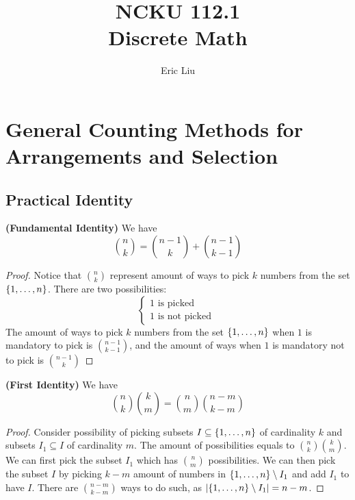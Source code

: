 \documentclass{report}
\title{\Huge{NCKU 112.1}\\Discrete Math}
\author{\huge{Eric Liu}}
\date{}
\begin{document}
\maketitle
\newpage%


\setcounter{chapter}{-1}
\tableofcontents
\pagebreak
\chapter{General Counting Methods for Arrangements and Selection}
\section{Practical Identity}
\begin{theorem}
\label{0.1.1}
\textbf{(Fundamental Identity)} We have
\begin{equation}
\binom{n}{k}=\binom{n-1}{k}+\binom{n-1}{k-1}
\end{equation}
\end{theorem}
\begin{proof}
Notice that  $\binom{n}{k}$ represent amount of ways to pick $k$ numbers from the set  $\{ 1,\dots ,n \}$. There are two possibilities:
\begin{equation}
\begin{cases}
  1\text{ is picked }\\
  1\text{ is not picked }
\end{cases}
\end{equation}
The amount of ways to pick $k$ numbers from the set  $\{ 1,\dots ,n \}$ when $1$ is mandatory to pick is $\binom{n-1}{k-1}$, and the amount of ways when $1$ is mandatory not to pick is  $\binom{n-1}{k}$
\end{proof}
\begin{theorem}
\label{0.1.2}
\textbf{(First Identity)} We have
\begin{equation*}
\binom{n}{k}\binom{k}{m}=\binom{n}{m}\binom{n-m}{k-m}
\end{equation*}
\end{theorem}
\begin{proof}
Consider possibility of picking subsets $I\subseteq \{ 1,\dots ,n \}$ of cardinality $k$  and subsets $I_1\subseteq I$ of cardinality $m$. The amount of possibilities equals to $\binom{n}{k}\binom{k}{m}$.\\

We can first pick the subset $I_1$ which has  $\binom{n}{m}$ possibilities. We can then pick the subset $I$ by picking  $k-m$ amount of numbers in  $\{ 1,\dots ,n \}\setminus I_1$ and add $I_1$ to have  $I$. There are  $\binom{n-m}{k-m}$ ways to do such, as $\left|\{ 1,\dots ,n \}\setminus I_1\right|=n-m$. 
\end{proof}
\end{document}

